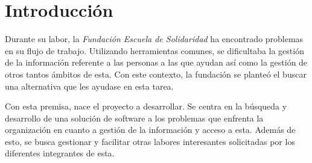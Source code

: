 \chapter{Introducción}

Durante su labor, la \textit{Fundación Escuela de Solidaridad} ha encontrado problemas en su flujo de trabajo. Utilizando herramientas comunes, se dificultaba la gestión de la información referente a las personas a las que ayudan así como la gestión de otros tantos ámbitos de esta. Con este contexto, la fundación se planteó el buscar una alternativa que les ayudase en esta tarea.

Con esta premisa, nace el proyecto a desarrollar. Se centra en la búsqueda y desarrollo de una solución de software a los problemas que enfrenta la organización en cuanto a gestión de la información y acceso a esta. Además de esto, se busca gestionar y facilitar otras labores interesantes solicitadas por los diferentes integrantes de esta.



